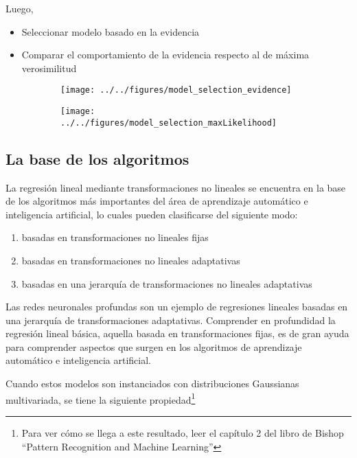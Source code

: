 Luego,

\begin{itemize}
 \item Seleccionar modelo basado en la evidencia
 \item Comparar el comportamiento de la evidencia respecto al de m\'axima verosimilitud
\end{itemize}

\begin{figure}[H]     
     \centering 
     \begin{subfigure}[b]{0.47\textwidth}
       \texttt{[image: ../../figures/model\_selection\_evidence]}
     \end{subfigure}
     \begin{subfigure}[b]{0.49\textwidth}
       \texttt{[image: ../../figures/model\_selection\_maxLikelihood]}
     \end{subfigure}
\end{figure}


\subsection{La base de los algoritmos}\label{ssec:gaussiana}

La regresi\'on lineal mediante transformaciones no lineales se encuentra en la base de los algoritmos m\'as importantes del \'area de aprendizaje autom\'atico e inteligencia artificial, lo cuales pueden clasificarse del siguiente modo:
\begin{enumerate}
 \setlength\itemsep{-1mm}
 \item basadas en transformaciones no lineales fijas
 \item basadas en transformaciones no lineales adaptativas
 \item basadas en una jerarqu\'ia de transformaciones no lineales adaptativas
\end{enumerate}

Las redes neuronales profundas son un ejemplo de regresiones lineales basadas en una jerarqu\'ia de transformaciones adaptativas.
Comprender en profundidad la regresi\'on lineal b\'asica, aquella basada en transformaciones fijas, es de gran ayuda para comprender aspectos que surgen en los algoritmos de aprendizaje autom\'atico e inteligencia artificial.

\vspace{0.3cm}

Cuando estos modelos son instanciados con distribuciones Gaussianas multivariada, se tiene la siguiente propiedad\footnote{Para ver c\'omo se llega a este resultado, leer el cap\'itulo 2 del libro de Bishop ``Pattern Recognition and Machine Learning''}
 
